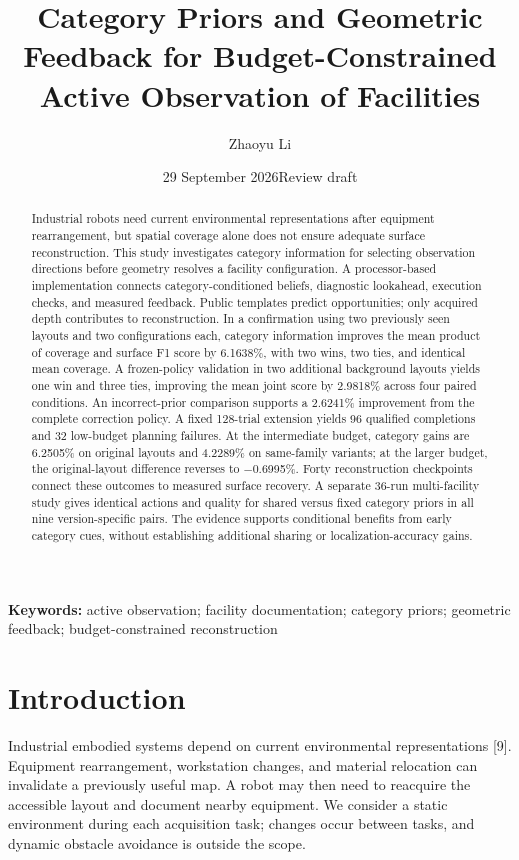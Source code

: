\documentclass[11pt,a4paper]{article}
\title{\textbf{Category Priors and Geometric Feedback for Budget-Constrained Active Observation of Facilities}}
\author{Zhaoyu Li}
\date{29 September 2026\quad Review draft}
\begin{document}
\maketitle
\begin{abstract}
Industrial robots need current environmental representations after equipment rearrangement, but spatial coverage alone does not ensure adequate surface reconstruction. This study investigates category information for selecting observation directions before geometry resolves a facility configuration. A processor-based implementation connects category-conditioned beliefs, diagnostic lookahead, execution checks, and measured feedback. Public templates predict opportunities; only acquired depth contributes to reconstruction. In a confirmation using two previously seen layouts and two configurations each, category information improves the mean product of coverage and surface F1 score by 6.1638\%, with two wins, two ties, and identical mean coverage. A frozen-policy validation in two additional background layouts yields one win and three ties, improving the mean joint score by 2.9818\% across four paired conditions. An incorrect-prior comparison supports a 2.6241\% improvement from the complete correction policy. A fixed 128-trial extension yields 96 qualified completions and 32 low-budget planning failures. At the intermediate budget, category gains are 6.2505\% on original layouts and 4.2289\% on same-family variants; at the larger budget, the original-layout difference reverses to −0.6995\%. Forty reconstruction checkpoints connect these outcomes to measured surface recovery. A separate 36-run multi-facility study gives identical actions and quality for shared versus fixed category priors in all nine version-specific pairs. The evidence supports conditional benefits from early category cues, without establishing additional sharing or localization-accuracy gains.
\end{abstract}
\noindent\textbf{Keywords:} active observation; facility documentation; category priors; geometric feedback; budget-constrained reconstruction

\hypertarget{introduction}{%
\section{Introduction}\label{introduction}}

Industrial embodied systems depend on current environmental representations {[}9{]}. Equipment rearrangement, workstation changes, and material relocation can invalidate a previously useful map. A robot may then need to reacquire the accessible layout and document nearby equipment. We consider a static environment during each acquisition task; changes occur between tasks, and dynamic obstacle avoidance is outside the scope.
\end{document}
